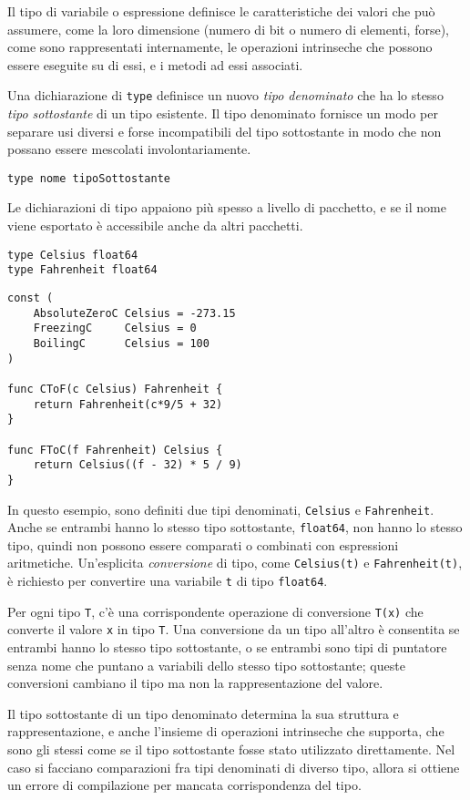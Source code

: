 %
Il tipo di variabile o espressione definisce le caratteristiche dei valori che può assumere, come la loro dimensione (numero di bit o numero di elementi, forse), come sono rappresentati internamente, le operazioni intrinseche che possono essere eseguite su di essi, e i metodi ad essi associati.

Una dichiarazione di \verb|type| definisce un nuovo \textit{tipo denominato} che ha lo stesso \textit{tipo sottostante} di un tipo esistente.
Il tipo denominato fornisce un modo per separare usi diversi e forse incompatibili del tipo sottostante in modo che non possano essere mescolati involontariamente.
\begin{lstlisting}[label={lst:lstlisting1-5.1}]
type nome tipoSottostante
\end{lstlisting}
Le dichiarazioni di tipo appaiono più spesso a livello di pacchetto, e se il nome viene esportato è accessibile anche da altri pacchetti.
\begin{lstlisting}[frame=single, label={lst:lstlisting1-5.2}]
type Celsius float64
type Fahrenheit float64
\end{lstlisting}
\begin{lstlisting}[frame=single, label={lst:lstlisting1-5.3}]
const (
    AbsoluteZeroC Celsius = -273.15
    FreezingC	  Celsius = 0
    BoilingC	  Celsius = 100
)

func CToF(c Celsius) Fahrenheit {
    return Fahrenheit(c*9/5 + 32)
}

func FToC(f Fahrenheit) Celsius {
    return Celsius((f - 32) * 5 / 9)
}
\end{lstlisting}
In questo esempio, sono definiti due tipi denominati, \verb|Celsius| e \verb|Fahrenheit|.
Anche se entrambi hanno lo stesso tipo sottostante, \verb|float64|, non hanno lo stesso tipo, quindi non possono essere comparati o combinati con espressioni aritmetiche.
Un'esplicita \textit{conversione} di tipo, come \verb|Celsius(t)| e \verb|Fahrenheit(t)|, è richiesto per convertire una variabile \verb|t| di tipo \verb|float64|.

Per ogni tipo \verb|T|, c'è una corrispondente operazione di conversione \verb|T(x)| che converte il valore \verb|x| in tipo \verb|T|.
Una conversione da un tipo all'altro è consentita se entrambi hanno lo stesso tipo sottostante, o se entrambi sono tipi di puntatore senza nome che puntano a variabili dello stesso tipo sottostante;
queste conversioni cambiano il tipo ma non la rappresentazione del valore.

Il tipo sottostante di un tipo denominato determina la sua struttura e rappresentazione, e anche l'insieme di operazioni intrinseche che supporta, che sono gli stessi come se il tipo sottostante fosse stato utilizzato direttamente.
Nel caso si facciano comparazioni fra tipi denominati di diverso tipo, allora si ottiene un errore di compilazione per mancata corrispondenza del tipo.

